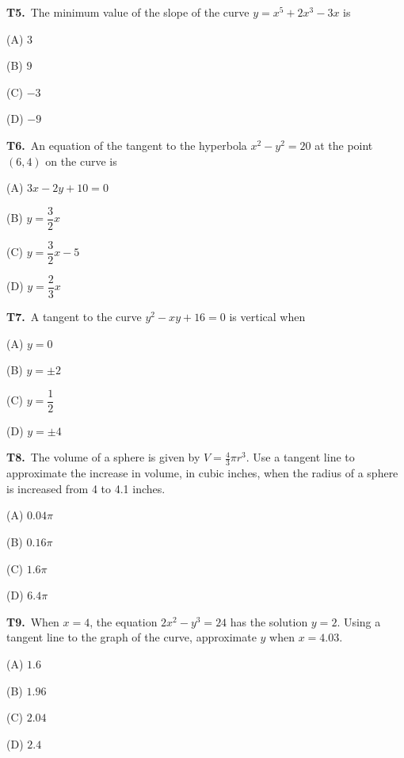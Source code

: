 \documentclass[11pt]{article}
\begin{document}
\bigskip\noindent\textbf{T5.}\ The minimum value of the slope of the curve $y = x^5 + 2x^3 - 3x$ is
\begin{list}{}{\setlength{\leftmargin}{3em}\setlength{\labelwidth}{2.5em}\setlength{\itemsep}{0pt}\setlength{\topsep}{2pt}}
\item[(A)] $3$
\item[(B)] $9$
\item[(C)] $-3$
\item[(D)] $-9$
\end{list}

\bigskip\noindent\textbf{T6.}\ An equation of the tangent to the hyperbola $x^2-y^2=20$ at the point $(6,4)$ on the curve is
\begin{list}{}{\setlength{\leftmargin}{3em}\setlength{\labelwidth}{2.5em}\setlength{\itemsep}{0pt}\setlength{\topsep}{2pt}}
\item[(A)] $3x-2y+10=0$
\item[(B)] $y = \dfrac{3}{2}x$
\item[(C)] $y = \dfrac{3}{2}x - 5$
\item[(D)] $y = \dfrac{2}{3}x$
\end{list}

\bigskip\noindent\textbf{T7.}\ A tangent to the curve $y^2-xy+16=0$ is vertical when
\begin{list}{}{\setlength{\leftmargin}{3em}\setlength{\labelwidth}{2.5em}\setlength{\itemsep}{0pt}\setlength{\topsep}{2pt}}
\item[(A)] $y=0$
\item[(B)] $y = \pm 2$
\item[(C)] $y = \dfrac{1}{2}$
\item[(D)] $y = \pm 4$
\end{list}

\bigskip\noindent\textbf{T8.}\ The volume of a sphere is given by $V = \frac{4}{3}\pi r^3$. Use a tangent line to approximate the increase in volume, in cubic inches, when the radius of a sphere is increased from 4 to 4.1 inches.
\begin{list}{}{\setlength{\leftmargin}{3em}\setlength{\labelwidth}{2.5em}\setlength{\itemsep}{0pt}\setlength{\topsep}{2pt}}
\item[(A)] $0.04\pi$
\item[(B)] $0.16\pi$
\item[(C)] $1.6\pi$
\item[(D)] $6.4\pi$
\end{list}

\bigskip\noindent\textbf{T9.}\ When $x=4$, the equation $2x^2-y^3=24$ has the solution $y=2$. Using a tangent line to the graph of the curve, approximate $y$ when $x=4.03$.
\begin{list}{}{\setlength{\leftmargin}{3em}\setlength{\labelwidth}{2.5em}\setlength{\itemsep}{0pt}\setlength{\topsep}{2pt}}
\item[(A)] $1.6$
\item[(B)] $1.96$
\item[(C)] $2.04$
\item[(D)] $2.4$
\end{list}
\end{document}
